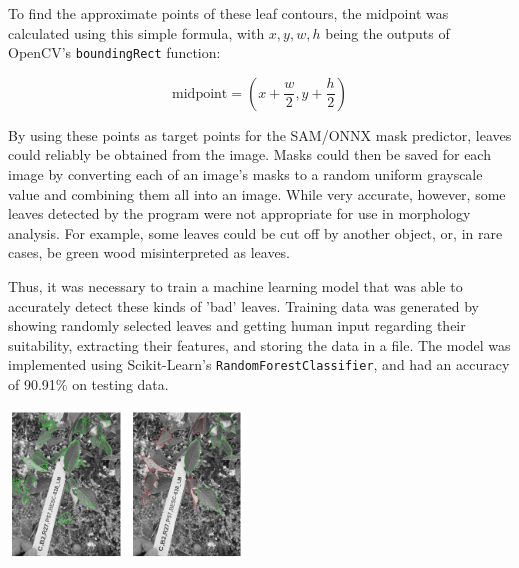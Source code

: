 \documentclass[final,5p,times,twocolumn,authoryear]{elsarticle}
\begin{document}
To find the approximate points of these leaf contours, the midpoint was calculated using this simple formula, with $x, y, w, h$ being the outputs of OpenCV's \verb|boundingRect| function:

\begin{equation}
    \mbox{midpoint} = (x + \frac{w}{2}, y + \frac{h}{2})
\end{equation}

By using these points as target points for the SAM/ONNX mask predictor, leaves could reliably be obtained from the image. Masks could then be saved for each image by converting each of an image's masks to a random uniform grayscale value and combining them all into an image. While very accurate, however, some leaves detected by the program were not appropriate for use in morphology analysis. For example, some leaves could be cut off by another object, or, in rare cases, be green wood misinterpreted as leaves.

Thus, it was necessary to train a machine learning model that was able to accurately detect these kinds of 'bad' leaves. Training data was generated by showing randomly selected leaves and getting human input regarding their suitability, extracting their features, and storing the data in a file. The model was implemented using Scikit-Learn's \verb|RandomForestClassifier|, and had an accuracy of 90.91\% on testing data.

\begin{center}
	\centering
	\includegraphics[width=0.23\textwidth]{images/seg_pipeline/6.png}	
        \includegraphics[width=0.23\textwidth]{images/seg_filter/2.png}	
\end{center}
\end{document}
